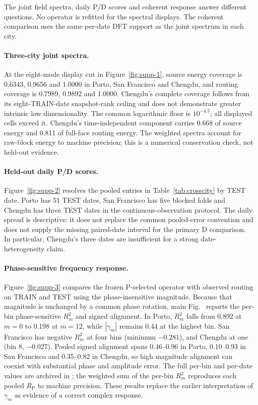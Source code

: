
The joint field spectra, daily P/D scores and coherent response answer different questions. No operator is refitted for the spectral displays. The coherent comparison uses the same per-date DFT support as the joint spectrum in each city.

\paragraph{Three-city joint spectra.} At the eight-mode display cut in Figure~\ref{fig:supp-1}, source energy coverage is 0.6343, 0.9656 and 1.0000 in Porto, San Francisco and Chengdu, and routing coverage is 0.7989, 0.9892 and 1.0000. Chengdu's complete coverage follows from its eight-TRAIN-date snapshot-rank ceiling and does not demonstrate greater intrinsic low dimensionality. The common logarithmic floor is $10^{-4.5}$; all displayed cells exceed it. Chengdu's time-independent component carries 0.668 of source energy and 0.811 of full-face routing energy. The weighted spectra account for raw-block energy to machine precision; this is a numerical conservation check, not held-out evidence.

\paragraph{Held-out daily P/D scores.} Figure~\ref{fig:supp-2} resolves the pooled entries in Table~\ref{tab:crosscity} by TEST date. Porto has 51 TEST dates, San Francisco has five blocked folds and Chengdu has three TEST dates in the continuous-observation protocol. The daily spread is descriptive: it does not replace the common pooled-error convention and does not supply the missing paired-date interval for the primary D comparison. In particular, Chengdu's three dates are insufficient for a strong date-heterogeneity claim.

\paragraph{Phase-sensitive frequency response.} Figure~\ref{fig:supp-3} compares the frozen P-selected operator with observed routing on TRAIN and TEST using the phase-insensitive magnitude. Because that magnitude is unchanged by a common phase rotation, main Fig.~ reports the per-bin phase-sensitive $R_m^2$ and signed alignment. In Porto, $R_m^2$ falls from 0.892 at $m=0$ to 0.198 at $m=12$, while $|\gamma_m|$ remains 0.44 at the highest bin. San Francisco has negative $R_m^2$ at four bins (minimum $-0.281$), and Chengdu at one (bin 8, $-0.027$). Pooled signed alignment spans 0.46--0.96 in Porto, 0.10--0.93 in San Francisco and 0.35--0.82 in Chengdu, so high magnitude alignment can coexist with substantial phase and amplitude error. The full per-bin and per-date values are archived in ; the weighted sum of the per-bin $R_m^2$ reproduces each pooled $R_{\mathrm P}$ to machine precision. These results replace the earlier interpretation of $\gamma_m$ as evidence of a correct complex response.

